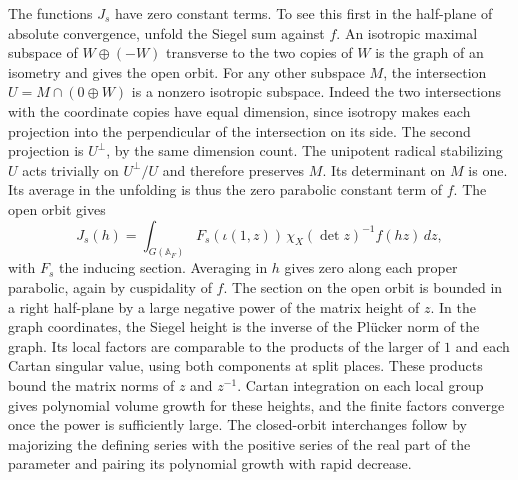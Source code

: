The functions \(J_s\) have zero constant terms. To see this first
in the half-plane of absolute convergence, unfold the Siegel sum
against \(f\). An isotropic maximal subspace of \(W\oplus(-W)\)
transverse to the two copies of \(W\) is the graph of an isometry
and gives the open orbit. For any other subspace \(M\), the
intersection \(U=M\cap(0\oplus W)\) is a nonzero isotropic
subspace. Indeed the two intersections with the coordinate copies
have equal dimension, since isotropy makes each projection into
the perpendicular of the intersection on its side. The second
projection is \(U^\perp\), by the same dimension count. The
unipotent radical stabilizing \(U\) acts trivially on
\(U^\perp/U\) and therefore preserves \(M\). Its determinant on
\(M\) is one. Its average in the unfolding is thus the zero
parabolic constant term of \(f\). The open orbit gives
\[
 J_s(h)=\int_{G(\mathbb A_F)} F_s(\iota(1,z))\,
            \chi_X(\det z)^{-1}f(hz)\,dz,
\]
with \(F_s\) the inducing section. Averaging in \(h\) gives zero
along each proper parabolic, again by cuspidality of \(f\).
The section on the open orbit is bounded in a right half-plane by
a large negative power of the matrix height of \(z\). In the
graph coordinates, the Siegel height is the inverse of the
Pl\"ucker norm of the graph. Its local factors are comparable to
the products of the larger of \(1\) and each Cartan singular value,
using both components at split places. These products bound the
matrix norms of \(z\) and \(z^{-1}\). Cartan integration on each
local group gives polynomial volume growth for these heights, and
the finite factors converge once the power is sufficiently large.
The closed-orbit interchanges follow by majorizing the defining
series with the positive series of the real part of the parameter
and pairing its polynomial growth with rapid decrease.


